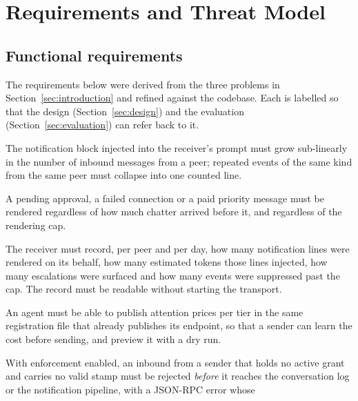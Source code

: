 \section{Requirements and Threat Model}
\label{sec:requirements}

\subsection{Functional requirements}

The requirements below were derived from the three problems in
Section~\ref{sec:introduction} and refined against the codebase. Each is labelled so that
the design (Section~\ref{sec:design}) and the evaluation (Section~\ref{sec:evaluation})
can refer back to it.

\begin{description}[style=nextline,leftmargin=1.2em]
  \item[FR1 --- Bounded context under flood.] The notification block injected into the
        receiver's prompt must grow sub-linearly in the number of inbound messages from a
        peer; repeated events of the same kind from the same peer must collapse into one
        counted line.
  \item[FR2 --- Escalations always visible.] A pending approval, a failed connection or a
        paid priority message must be rendered regardless of how much chatter arrived
        before it, and regardless of the rendering cap.
  \item[FR3 --- Attention is measured.] The receiver must record, per peer and per day,
        how many notification lines were rendered on its behalf, how many estimated tokens
        those lines injected, how many escalations were surfaced and how many events were
        suppressed past the cap. The record must be readable without starting the
        transport.
  \item[FR4 --- Prices are discoverable.] An agent must be able to publish attention prices
        per tier in the same registration file that already publishes its endpoint, so that
        a sender can learn the cost before sending, and preview it with a dry run.
  \item[FR5 --- Enforcement is opt-in and machine-readable.] With enforcement enabled, an
        inbound  from a sender that holds no active 
        grant and carries no valid stamp must be rejected \emph{before} it reaches the
        conversation log or the notification pipeline, with a JSON-RPC error whose

\end{description}
